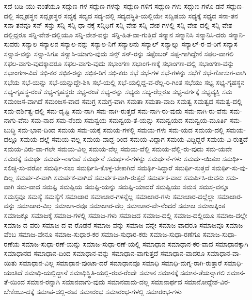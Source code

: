 {ಸದೆ-ಬಡಿ-ಯು-ವಂತೆಯೂ
ಸದ್ಗುಣ-ಗಳ
ಸದ್ಗುಣ-ಗಳನ್ನು
ಸದ್ಗುಣ-ಗಳಿಗೆ
ಸದ್ಗುಣ-ಗಳು
ಸದ್ಗುಣ-ಗಳೊ-ಡನೆ
ಸದ್ಗುಣ-ದಲ್ಲಿ
ಸದ್ಗೃಹಸ್ಥನ
ಸದ್ಗೃಹಸ್ಥರ
ಸದ್ಯಕ್ಕೆ
ಸದ್ಯದ
ಸದ್ಯ-ದಲ್ಲಿ
ಸದ್ಯದಸ್ಥಿತಿ-ಯಲ್ಲಿಯೇ
ಸದ್ವಿಷಯ
ಸಧ್ಯಕ್ಕೆ
ಸಧ್ಯದ
ಸನಾ-ತನ
ಸನಾ-ತನವೂ
ಸನ್
ಸನ್ತು
ಸನ್ನಿ
ಸನ್ನಿ-ಧಾ-ನಕ್ಕೆ
ಸನ್ನಿಧಿಗೆ
ಸನ್ನಿ-ವೇಶ
ಸನ್ನಿ-ವೇಶ-ಗಳಲ್ಲಿ
ಸನ್ನಿ-ವೇಶ-ದಲ್ಲಿ
ಸನ್ನಿ-ವೇಶ-ದಲ್ಲಿದ್ದರೂ
ಸನ್ನಿ-ವೇಶ-ದಲ್ಲಿಯೂ
ಸನ್ನಿ-ವೇಶ-ವನ್ನು
ಸನ್ನಿ-ಹಿತ-ವಾ-ಗುತ್ತಿದೆ
ಸನ್ಮಾನ
ಸನ್ಮಾನಿಸಿ
ಸನ್ಮಾನಿಸಿ-ದರು
ಸನ್ಮಾನಿ-ಸುವರು
ಸನ್ಯಾಲ
ಸನ್ಯಾಲನ
ಸನ್ಯಾಲ-ನನ್ನು
ಸನ್ಯಾಲ-ನಿಗೆ
ಸನ್ಯಾಲನು
ಸನ್ಯಾಲ್
ಸನ್ಯಾಲ್ನು
ಸನ್ಯಾಲ್-ರ-ವ-ರಿಗೆ
ಸನ್ಯಾಸ
ಸನ್ಯಾಸ-ವನ್ನು
ಸನ್ಯಾ-ಸಿಗೂ
ಸನ್ಯಾಸಿ-ಯಾಗು-ವುದು
ಸನ್ಸ್
ಸನ್-ರನ್ನು
ಸಪ್ಟೆಂಬರ್
ಸಪ್ಪ-ಗಾಗಿದ್ದೇನೆ
ಸಫಲ-ವಾಗಲಿ
ಸಫಲ-ವಾಗು-ವುದಕ್ಕಾದರೂ
ಸಫಲ-ವಾಗು-ವುದು
ಸಭಾಂಗಣ
ಸಭಾಂಗ-ಣಕ್ಕೆ
ಸಭಾಂಗಣ-ದಲ್ಲಿ
ಸಭಾಂಗಣ-ವನ್ನು
ಸಭಾಂಗಣ-ವಿದೆ
ಸಭಿ-ಕರ
ಸಭಿಕ-ರನ್ನು
ಸಭಿಕ-ರಿಗೆ
ಸಭಿ-ಕರು
ಸಭೆ
ಸಭೆ-ಗಳ
ಸಭೆ-ಗಳನ್ನು
ಸಭೆಗೆ
ಸಭೆ-ಗೋಸುಗ-ವಾಗಿ
ಸಭೆಯ
ಸಭೆ-ಯನ್ನು
ಸಭೆ-ಯನ್ನುದ್ದೇ-ಶಿಸಿ
ಸಭೆ-ಯಲ್ಲಿ
ಸಭೆ-ಯಲ್ಲಿದ್ದ-ವ-ರೆಲ್ಲ-ರಿ-ಗಿಂತ
ಸಭೆಯು
ಸಭ್ಯ
ಸಭ್ಯ-ಗೃಹಸ್ಥನ
ಸಭ್ಯ-ಗೃಹಸ್ಥ-ರಂತೆ
ಸಭ್ಯ-ಗೃಹಸ್ಥರು
ಸಭ್ಯ-ರಂತೆ
ಸಭ್ಯ-ರನ್ನು
ಸಭ್ಯರು
ಸಭ್ಯ-ರೆಲ್ಲರೂ
ಸಭ್ಯ-ವರ್ಗಕ್ಕೆ
ಸಭ್ಯವ್ಯಕ್ತಿ
ಸಮ
ಸಮಂಜಸ-ವಾಗಿದೆ
ಸಮಂಜಸ-ವಾದ
ಸಮಗ್ರ
ಸಮಗ್ರ-ವಾಗಿ
ಸಮತಾ
ಸಮತಾ-ವಾದಿ
ಸಮತ್ವ
ಸಮತ್ವದ
ಸಮತ್ವ-ದಲ್ಲಿ
ಸಮ-ದರ್ಶಿತ್ವ-ದಲ್ಲಿ
ಸಮ-ದೃಷ್ಟಿ
ಸಮ-ನಾಗಿ
ಸಮ-ನಾಗಿ-ರುತ್ತದೆ
ಸಮ-ನಾಗಿ-ರು-ವುದು
ಸಮ-ನಾಗಿ-ರು-ವೆನು
ಸಮ-ನಾಗು-ವೆನು
ಸಮ-ನಾದ
ಸಮ-ನೆಂದು
ಸಮನ್ವಯ
ಸಮನ್ವಯ-ತೆ-ಯನ್ನು
ಸಮನ್ವಯದ
ಸಮನ್ವಯ-ಮೂರ್ತಿ
ಸಮ-ಬುದ್ಧಿ
ಸಮ-ಭಾವ-ದಿಂದ
ಸಮಯ
ಸಮ-ಯಕ್ಕೆ
ಸಮಯ-ಗಳಲ್ಲಿ
ಸಮಯ-ಗಳು
ಸಮ-ಯದ
ಸಮಯ-ದಲ್ಲಿ
ಸಮಯ-ದಲ್ಲೂ
ಸಮಯ-ದಲ್ಲೆ
ಸಮಯ-ವಲ್ಲ
ಸಮಯ-ವಾದ್ದ-ರಿಂದ
ಸಮಯ-ವಿದ್ದಾಗ
ಸಮಯ-ವಿದ್ದಿದ್ದರೆ
ಸಮಯ-ವಿ-ರುತ್ತದೆ
ಸಮಯ-ವಿರು-ವಾ-ಗಲೇ
ಸಮಯ-ವಿಲ್ಲ
ಸಮಯ-ವೆಲ್ಲ
ಸಮಯ-ವೆಲ್ಲಿ
ಸಮಯ-ವೆಲ್ಲಿ-ರು-ವುದು
ಸಮ-ಯವೇ
ಸಮರಕ್ಕೆ
ಸಮರ್ಥ
ಸಮರ್ಥ-ನಾಗುವೆ
ಸಮರ್ಥನೆ
ಸಮರ್ಥನೆ-ಗಳನ್ನು
ಸಮರ್ಥನೆ-ಗಳು
ಸಮರ್ಥ-ಯಿತುಂ
ಸಮರ್ಥಿ-ಸಲಿಚ್ಛಿ-ಸು-ವರೋ
ಸಮರ್ಥಿ-ಸಲು
ಸಮರ್ಥಿಸಿ-ಕೊಳ್ಳ-ಬೇಕಾಗಿದೆ
ಸಮರ್ಥಿ-ಸಿದ್ದಾರೆ
ಸಮರ್ಥಿ-ಸುತ್ತವೆ
ಸಮರ್ಥಿ-ಸು-ವು-ದಿಲ್ಲ
ಸಮರ್ಪ-ಕ-ವಾಗಿ
ಸಮರ್ಪಕ-ವಾಗಿದೆ
ಸಮರ್ಪಕ-ವಾಗಿ-ರುತ್ತದೆ
ಸಮರ್ಪಕ-ವಾದ
ಸಮರ್ಪಿಸಿ-ರುವನು
ಸಮ-ವಾಗಿ
ಸಮ-ವಾದ
ಸಮಷ್ಟಿ
ಸಮಷ್ಟಿಯ
ಸಮಷ್ಟಿ-ಯನ್ನು
ಸಮಷ್ಟಿ-ಯಾದರೆ
ಸಮಷ್ಟಿಯು
ಸಮಸ್ತ
ಸಮಸ್ತ-ವನ್ನೂ
ಸಮಸ್ತವೂ
ಸಮಸ್ಯೆ
ಸಮಸ್ಯೆಗೆ
ಸಮಾಚಾರ
ಸಮಾಚಾರ-ಗಳನ್ನೆಲ್ಲ
ಸಮಾಚಾರ-ಗಳು
ಸಮಾಚಾರ-ದಲ್ಲೆಲ್ಲಾ
ಸಮಾಚಾರ-ವನ್ನು
ಸಮಾಚಾರ-ವಿಲ್ಲ
ಸಮಾಚಾ-ರವೂ
ಸಮಾಚಾರ-ವೆಲ್ಲ
ಸಮಾಚಾರ-ವೇ-ನೆಂದರೆ
ಸಮಾಜ
ಸಮಾಜಕ್ಕಿಂತ
ಸಮಾಜಕ್ಕೂ
ಸಮಾಜಕ್ಕೆ
ಸಮಾಜ-ಗಳಲ್ಲಿ
ಸಮಾಜ-ಗಳು
ಸಮಾಜದ
ಸಮಾಜ-ದಲ್ಲಿ
ಸಮಾಜ-ದಲ್ಲಿಯೂ
ಸಮಾಜ-ದಲ್ಲೇ
ಸಮಾಜ-ದ-ವರು
ಸಮಾಜ-ದ-ವ-ರೊಡನೆ
ಸಮಾಜ-ವನ್ನು
ಸಮಾಜ-ವನ್ನೇ
ಸಮಾಜ-ವಾದರೂ
ಸಮಾಜವೂ
ಸಮಾಜ-ವೆಂಬ
ಸಮಾಜ-ವೇನೂ
ಸಮಾಜ-ಸುಧಾರ-ಕರ
ಸಮಾಜ-ಸುಧಾರ-ಕರು
ಸಮಾಜ-ಸುಧಾ-ರಣೆಗೂ
ಸಮಾಜ-ಸುಧಾ-ರಣೆಯ
ಸಮಾಜ-ಸುಧಾ-ರಣೆ-ಯನ್ನು
ಸಮಾಜ-ಸುಧಾ-ರಣೆ-ಯಲ್ಲಿ
ಸಮಾಧಾನ
ಸಮಾಧಾನ-ಕರ-ವಾದ
ಸಮಾಧಾನಕ್ಕಾಗಿ
ಸಮಾಧಾನದ
ಸಮಾಧಾನ-ದಿಂದ
ಸಮಾಧಾನ-ವನ್ನು
ಸಮಾಧಾನ-ವಾಗುತ್ತದೆ
ಸಮಾಧಾನ-ವಾದರೂ
ಸಮಾಧಾನ-ವಾ-ಯಿತು
ಸಮಾಧಾನ-ವಿಲ್ಲ
ಸಮಾಧಾನ-ವುಂಟಾ-ದರೆ
ಸಮಾಧಾನವೂ
ಸಮಾಧಿ
ಸಮಾಧಿ-ಮಗ್ನ-ರಾಗಿ-ರುತ್ತಾರೆ
ಸಮಾಧಿ-ಯಂತಿದೆ
ಸಮಾಧಿ-ಯಲ್ಲಿದ್ದಾನೆ
ಸಮಾಧಿಸ್ಥಿತಿ-ಯಲ್ಲಿ-ರುವ-ರೆಂದೇ
ಸಮಾನ
ಸಮಾನಕ್ಕೆ
ಸಮಾನ-ತೆಯನ್ನಾಗಲಿ
ಸಮಾನ-ತೆ-ಯಿಂದ
ಸಮಾನ-ರನ್ನಾಗಿ
ಸಮಾನವಾಗು-ವುದು
ಸಮಾನವಾದು-ದಲ್ಲ
ಸಮಾನಾರ್ಥದ
ಸಮಾನೋದ್ದೇಶ-ವಿರ-ಬೇಕೆಂಬು-ದಕ್ಕೆ
ಸಮಾಪ-ದಲ್ಲಿ-ರುವ
ಸಮಾರಂಭ
ಸಮಾರಂಭ-ಗಳಲ್ಲಿ
ಸಮಾರಂಭ-ಗಳು
}
